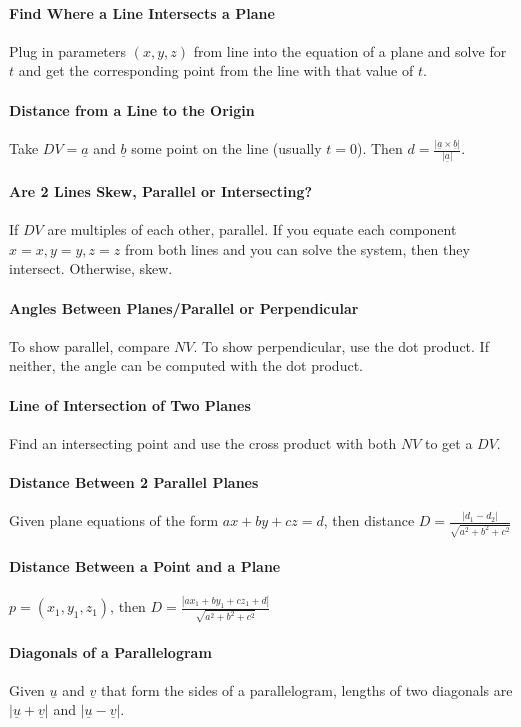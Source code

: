 \documentclass[12 pt]{article}
\theoremstyle{definition}
\begin{document}
\paragraph{Find Where a Line Intersects a Plane} Plug in parameters $(x,y,z)$ from line into the equation of a plane and solve for $t$ and get the corresponding point from the line with that value of $t$.
\paragraph{Distance from a Line to the Origin} Take $DV=\underline{a}$ and $\underline{b}$ some point on the line (usually $t=0$). Then $d=\frac{|\underline{a}\times \underline{b}|}{|\underline{a}|}$.
\paragraph{Are 2 Lines Skew, Parallel or Intersecting?} If $DV$ are multiples of each other, parallel. If you equate each component $x=x,y=y,z=z$ from both lines and you can solve the system, then they intersect. Otherwise, skew.
\paragraph{Angles Between Planes/Parallel or Perpendicular} To show parallel, compare $NV$. To show perpendicular, use the dot product. If neither, the angle can be computed with the dot product.
\paragraph{Line of Intersection of Two Planes} Find an intersecting point and use the cross product with both $NV$ to get a $DV$.  
\paragraph{Distance Between 2 Parallel Planes} Given plane equations of the form $ax+by+cz=d$, then distance $D=\frac{|d_1-d_2|}{\sqrt{a^2+b^2+c^2}}$
\paragraph{Distance Between a Point and a Plane} $p=(x_1,y_1,z_1)$, then $D=\frac{|ax_1+by_1+cz_1+d|}{\sqrt{a^2+b^2+c^2}}$
\paragraph{Diagonals of a Parallelogram} Given $\underline{u}$ and $\underline{v}$ that form the sides of a parallelogram, lengths of two diagonals are $|\underline{u}+\underline{v}|$ and $|\underline{u}-\underline{v}|$.
\end{document}
